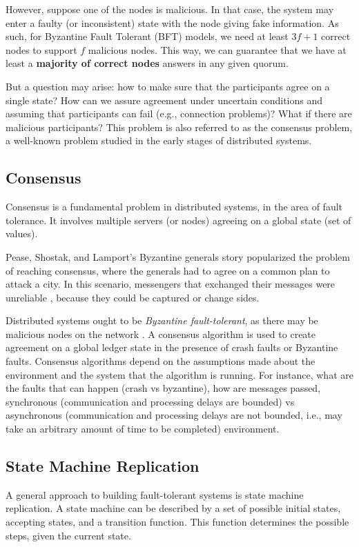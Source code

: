 \documentclass[12pt,a4paper]{article}
\begin{document}
However, suppose one of the nodes is malicious. In that case, the system may enter a faulty (or inconsistent) state with the node giving fake information. As such, for Byzantine Fault Tolerant (BFT) models, we need at least $3f+1$ correct nodes to support $f$ malicious nodes. This way, we can guarantee that we have at least a \textbf{majority of correct nodes} answers in any given quorum.

But a question may arise: how to make sure that the participants agree on a single state? How can we assure agreement under uncertain conditions and assuming that participants can fail (e.g., connection problems)? What if there are malicious participants? This problem is also referred to as the consensus problem, a well-known problem studied in the early stages of distributed systems.


\subsection{Consensus}
Consensus is a fundamental problem in distributed systems, in the area of fault tolerance. It involves multiple servers (or nodes) agreeing on a global state (set of values). 

Pease, Shostak, and Lamport's Byzantine generals story popularized the problem of reaching consensus, where the generals had to agree on a common plan to attack a city. In this scenario, messengers that exchanged their messages were unreliable \cite{byzantine_generals}, because they could be captured or change sides.  

Distributed systems ought to be \emph{Byzantine fault-tolerant}, as there may be malicious nodes on the network \cite{correia2019byzantine}.  A consensus algorithm is used to create agreement on a global ledger state in the presence of crash faults or Byzantine faults. Consensus algorithms depend on the assumptions made about the environment and the system that the algorithm is running. For instance, what are the faults that can happen (crash vs byzantine), how are messages passed, synchronous (communication and processing delays are bounded) vs asynchronous (communication and processing delays are not bounded, i.e., may take an arbitrary amount of time to be completed) environment.

\subsection{State Machine Replication}
A general approach to building fault-tolerant systems is state machine replication. A state machine can be described by a set of possible initial states,  accepting states, and a transition function. This function determines the possible steps, given the current state.
\end{document}
